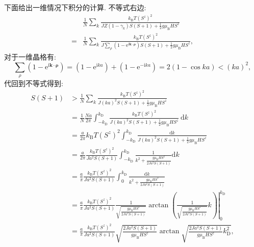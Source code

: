 下面给出一维情况下积分的计算. 不等式右边:
\begin{align}
&\frac{1}{N} \sum_{k} \frac{k_{\mathrm{B}} T\left(S^{z}\right)^{2}}{J Z\left(1-\gamma_{k}\right) S(S+1)+\frac{1}{2} g \mu_{\mathrm{B}} H S^{z}}\nonumber\\
=&\frac{1}{N} \sum_{k} \frac{k_{\mathrm{B}} T\left(S^{z}\right)^{2}}{J \sum_{\rho}\left(1-\mathrm{e}^{\mathrm{i} \boldsymbol{k} \cdot \boldsymbol{\rho}}\right) S(S+1)+\frac{1}{2} g \mu_{\mathrm{B}} H S^{z}},
\end{align}
对于一维晶格有:
\begin{equation}
\sum_{\rho}\left(1-\mathrm{e}^{\mathrm{i} \boldsymbol{k} \cdot \boldsymbol{\rho}}\right)=\left(1-\mathrm{e}^{\mathrm{i} k a}\right)+\left(1-\mathrm{e}^{-\mathrm{i} k a}\right)=2(1-\cos k a)<(k a)^{2},
\end{equation}
代回到不等式得到:
\begin{align}
S(S+1) &>\frac{1}{N} \sum_{k} \frac{k_{\mathrm{B}} T\left(S^{z}\right)^{2}}{J(k a)^{2} S(S+1)+\frac{1}{2} g \mu_{\mathrm{B}} H S^{z}}\nonumber \\
&=\frac{1}{N} \frac{N a}{2 \pi} \int_{-k_{\mathrm{D}}}^{k_{\mathrm{D}}} \frac{k_{\mathrm{B}} T\left(S^{z}\right)^{2}}{J(k a)^{2} S(S+1)+\frac{1}{2} g \mu_{\mathrm{B}} H S^{z}} \mathrm{~d} k\nonumber \\
&=\frac{a}{2 \pi} k_{\mathrm{B}} T\left(S^{z}\right)^{2} \int_{-k_{\mathrm{D}}}^{k_{\mathrm{D}}} \frac{\mathrm{d} k}{J(k a)^{2} S(S+1)+\frac{1}{2} g \mu_{\mathrm{B}} H S^{z}} \nonumber\\
&=\frac{a}{2 \pi} \frac{k_{\mathrm{B}} T\left(S^{z}\right)^{2}}{J a^{2} S(S+1)} \int_{-k_{\mathrm{D}}}^{k_{\mathrm{D}}} \frac{1}{k^{2}+\frac{g \mu_{\mathrm{B}} H S^{z}}{2 J a^{2} S(S+1)}} \mathrm{d} k \nonumber\\
&=\frac{a}{\pi} \frac{k_{\mathrm{B}} T\left(S^{z}\right)^{2}}{J a^{2} S(S+1)} \int_{0}^{k_{\mathrm{D}}} \frac{\mathrm{d} k}{k^{2}+\frac{g \mu_{\mathrm{B}} H S^{z}}{2 J a^{2} S(S+1)}}\nonumber\\
&=\left.\frac{a}{\pi} \frac{k_{\mathrm{B}} T\left(S^{z}\right)^{2}}{J a^{2} S(S+1)} \frac{1}{\sqrt{\frac{g \mu_{\mathrm{B}} H S^{z}}{2 J a^{2} S(S+1)}}} \arctan \left(\frac{1}{\sqrt{\frac{g \mu_{\mathrm{B}} H S^{z}}{2 J a^{2} S(S+1)}}} k\right)\right|_{0} ^{k_{\mathrm{D}}}\nonumber\\
&=\frac{a}{\pi} \frac{k_{\mathrm{B}} T\left(S^{z}\right)^{2}}{J a^{2} S(S+1)} \sqrt{\frac{2 J a^{2} S(S+1)}{g \mu_{\mathrm{B}} H S^{z}}} \arctan\sqrt{\frac{2 J a^{2} S(S+1)}{g \mu_{\mathrm{B}} H S^{z} }k_{\mathrm{D}}^{2}},
\end{align}
